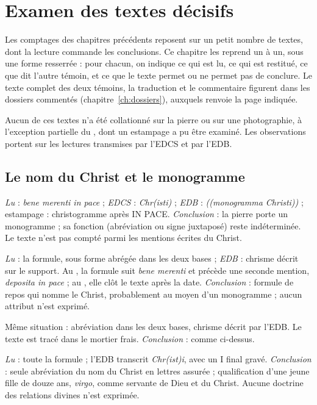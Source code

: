 \chapter{Examen des textes décisifs}\label{ch:textes_decisifs}

Les comptages des chapitres précédents reposent sur un petit nombre de textes, dont la lecture commande les conclusions. Ce chapitre les reprend un à un, sous une forme resserrée : pour chacun, on indique ce qui est lu, ce qui est restitué, ce que dit l’autre témoin, et ce que le texte permet ou ne permet pas de conclure. Le texte complet des deux témoins, la traduction et le commentaire figurent dans les dossiers commentés (chapitre~\ref{ch:dossiers}), auxquels renvoie la page indiquée.

Aucun de ces textes n’a été collationné sur la pierre ou sur une photographie, à l’exception partielle du , dont un estampage a pu être examiné. Les observations portent sur les lectures transmises par l’EDCS et par l’EDB.

\section{Le nom du Christ et le monogramme}

\begin{description}[style=nextline,leftmargin=1.5em,font=\normalfont\bfseries]
\item[\nnum{38} (352) — Privata, \emph{in pace} + monogramme (p.~\pageref{dos:38})] \emph{Lu} : \emph{bene merenti in pace} ; \emph{EDCS} : \emph{Chr(isti)} ; \emph{EDB} : \emph{((monogramma Christi))} ; estampage : christogramme après IN PACE. \emph{Conclusion} : la pierre porte un monogramme ; sa fonction (abréviation ou signe juxtaposé) reste indéterminée. Le texte n’est pas compté parmi les mentions écrites du Christ.
\item[\nnums{140} (370) et 151 (371) — \emph{in pace Chr(isti)} (p.~\pageref{dos:140}, \pageref{dos:151})] \emph{Lu} : la formule, sous forme abrégée dans les deux bases ; \emph{EDB} : chrisme décrit sur le support. Au , la formule suit \emph{bene merenti} et précède une seconde mention, \emph{deposita in pace} ; au , elle clôt le texte après la date. \emph{Conclusion} : formule de repos qui nomme le Christ, probablement au moyen d’un monogramme ; aucun attribut n’est exprimé.
\item[\nnum{311} (388) — \emph{deposita in Chr(isto)} (p.~\pageref{dos:311})] Même situation : abréviation dans les deux bases, chrisme décrit par l’EDB. Le texte est tracé dans le mortier frais. \emph{Conclusion} : comme ci-dessus.
\item[\nnum{458} (401) — \emph{ancilla dei et Chr(ist)i} (p.~\pageref{dos:458})] \emph{Lu} : toute la formule ; l’EDB transcrit \emph{Chr(ist)i}, avec un I final gravé. \emph{Conclusion} : seule abréviation du nom du Christ en lettres assurée ; qualification d’une jeune fille de douze ans, \emph{virgo}, comme servante de Dieu et du Christ. Aucune doctrine des relations divines n’est exprimée.
\end{description}

